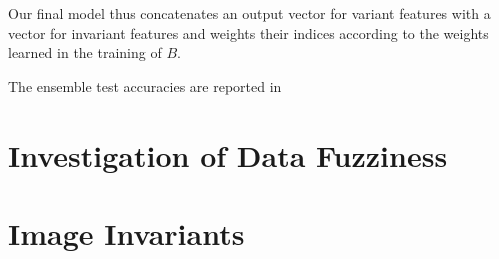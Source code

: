 Our final model thus concatenates an output vector for variant features with a vector for invariant features and weights their indices according to the weights learned in the training of $B$. 



The ensemble test accuracies are reported in

\section{Investigation of Data Fuzziness}



\section{Image Invariants}





























